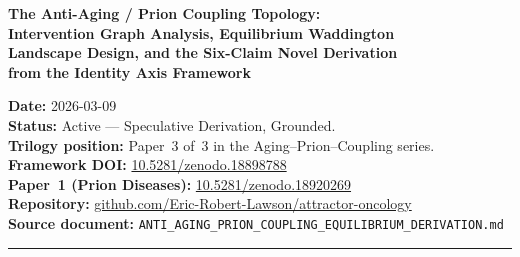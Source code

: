 \documentclass[12pt,a4paper]{article}
\newcommand{\Inet}[1]{$I_{#1}$}
\begin{document}
\begin{titlepage}
\vspace*{1.5cm}
{\LARGE\bfseries The Anti-Aging / Prion Coupling Topology:\\[0.5em]
\large Intervention Graph Analysis, Equilibrium Waddington\\
Landscape Design, and the Six-Claim Novel Derivation\\
from the Identity Axis Framework}

\vspace{1.5em}

\author[1]{Eric Robert Lawson}

\vspace{1.5em}

\noindent\textbf{Date:} 2026-03-09\\
\textbf{Status:} Active --- Speculative Derivation, Grounded.\\
\textbf{Trilogy position:} Paper~3 of~3 in the Aging--Prion--Coupling series.\\
\textbf{Framework DOI:}
\href{https://doi.org/10.5281/zenodo.18898788}{10.5281/zenodo.18898788}\\
\textbf{Paper~1 (Prion Diseases):}
\href{https://doi.org/10.5281/zenodo.18920269}{10.5281/zenodo.18920269}\\
\textbf{Repository:}
\href{https://github.com/Eric-Robert-Lawson/attractor-oncology}{github.com/Eric-Robert-Lawson/attractor-oncology}\\
\textbf{Source document:} \texttt{ANTI\_AGING\_PRION\_COUPLING\_EQUILIBRIUM\_DERIVATION.md}

\vspace{1.5em}
\noindent\rule{\textwidth}{0.8pt}

\begin{abstract}
\noindent
This paper derives a distinct and previously unnamed object of analysis:
the \textit{drug target interaction topology} of a combined anti-aging and
prion prophylaxis protocol. When the interventions derived from the Identity
Axis Framework are mapped as a seven-node graph (\Inet{1}--\Inet{7}), four
antagonistic couplings emerge that determine whether the combined protocol
is safe and whether it closes into a stable Waddington equilibrium or
amplifies the risks it is designed to prevent.


\end{abstract}
\end{titlepage}
\end{document}
